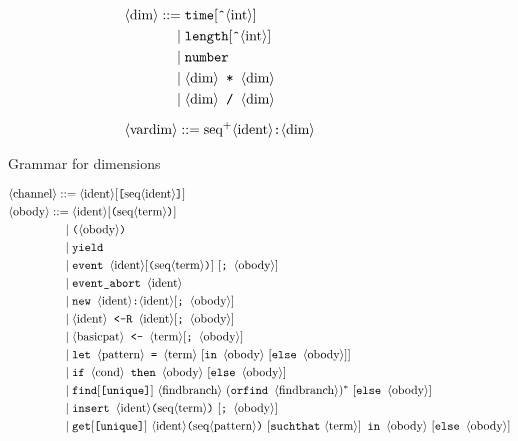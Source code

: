 \begin{figure}[tp]
\def\phd{\phantom{\nonterm{dim} = }\mid}
\begin{align*}
&\nonterm{dim} ::= \texttt{time}[\texttt{\^{ }}\nonterm{int}]\\
&\phd \texttt{length}[\texttt{\^{ }}\nonterm{int}]\\
&\phd \texttt{number}\\
&\phd \nonterm{dim}\texttt{ * }\nonterm{dim}\\
&\phd \nonterm{dim}\texttt{ / }\nonterm{dim}\\[2mm]
&\nonterm{vardim} ::= \neseq{ident}\texttt{:}\nonterm{dim}
\end{align*}
\caption{Grammar for dimensions}
\label{fig:syntaxdim}
\end{figure}

\begin{figure}[tp]
\def\phop{\phantom{\oprocess = }\mid}
\def\phip{\phantom{\iprocess = }\mid}
\begin{align*}
&\nonterm{channel} ::= \nonterm{ident}[\texttt{[}\seq{ident}\texttt{]}]\\
&\oprocess ::= \nonterm{ident}[\texttt{(}\seq{term}\texttt{)}]\\
&\phop \texttt{(} \oprocess \texttt{)}\\
&\phop \yield\\
&\phop \texttt{event }\nonterm{ident}[\texttt{(}\seq{term}\texttt{)}]\ [\texttt{; }\oprocess]\\
&\phop \texttt{event\string_abort }\nonterm{ident}\\
&\phop \Resavt[\texttt{; }\oprocess]\\
&\phop \Resbvt[\texttt{; }\oprocess]\\
&\phop \nonterm{basicpat} \texttt{ <- }\nonterm{term}[\texttt{; }\oprocess]\\
&\phop \texttt{let }\nonterm{pattern} \texttt{ = }\nonterm{term}\ 
[\texttt{in }\oprocess\ [\texttt{else }\oprocess]]\\
&\phop \texttt{if }\nonterm{cond}\texttt{ then }\oprocess\ [\texttt{else }\oprocess]\\
&\phop \texttt{find}[\texttt{[unique]}]\ \nonterm{findbranch}\ (\texttt{orfind }\nonterm{findbranch})^* \ [\texttt{else }\oprocess]\\
&\phop \texttt{insert }\nonterm{ident}\texttt{(}\seq{term}\texttt{)}\ [\texttt{; }\oprocess]\\
&\phop \texttt{get}[\texttt{[unique]}]\ \nonterm{ident}\texttt{(}\seq{pattern}\texttt{)}\ [\texttt{suchthat}\ \nonterm{term}]\texttt{ in }\oprocess\ [\texttt{else }\oprocess]\\

\end{align*}
\end{figure}
